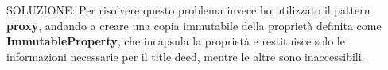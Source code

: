 SOLUZIONE:
Per risolvere questo problema invece ho utilizzato il pattern \textbf{proxy}, 
andando a creare una copia immutabile della proprietà definita come \textbf{ImmutableProperty}, 
che incapsula la proprietà e restituisce solo le informazioni necessarie per il title deed, mentre le altre sono inaccessibili.\newline